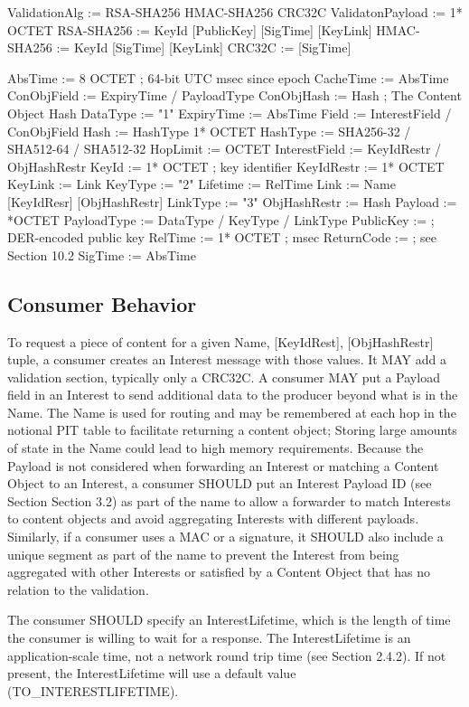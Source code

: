 \documentclass[12pt]{report}
\begin{document}
ValidationAlg := RSA-SHA256 HMAC-SHA256 CRC32C
ValidatonPayload := 1* OCTET
RSA-SHA256    := KeyId [PublicKey] [SigTime] [KeyLink]
HMAC-SHA256   := KeyId [SigTime] [KeyLink]
CRC32C        := [SigTime]

AbsTime       := 8 OCTET ; 64-bit UTC msec since epoch
CacheTime     := AbsTime
ConObjField   := ExpiryTime / PayloadType
ConObjHash    := Hash ; The Content Object Hash
DataType      := "1"
ExpiryTime    := AbsTime
Field         := InterestField / ConObjField
Hash          := HashType 1* OCTET
HashType      := SHA256-32 / SHA512-64 / SHA512-32
HopLimit      := OCTET
InterestField := KeyIdRestr / ObjHashRestr
KeyId         := 1* OCTET ; key identifier
KeyIdRestr    := 1* OCTET
KeyLink       := Link
KeyType       := "2"
Lifetime      := RelTime
Link          := Name [KeyIdResr] [ObjHashRestr]
LinkType      := "3"
ObjHashRestr  := Hash
Payload       := *OCTET
PayloadType   := DataType / KeyType / LinkType
PublicKey     := ; DER-encoded public key
RelTime       := 1* OCTET ; msec
ReturnCode    := ; see Section 10.2
SigTime       := AbsTime

\subsection{Consumer Behavior}
To request a piece of content for a given {Name, [KeyIdRest],
[ObjHashRestr]} tuple, a consumer creates an Interest message with
those values.  It MAY add a validation section, typically only a
CRC32C.  A consumer MAY put a Payload field in an Interest to send
additional data to the producer beyond what is in the Name.  The Name
is used for routing and may be remembered at each hop in the notional
PIT table to facilitate returning a content object; Storing large
amounts of state in the Name could lead to high memory requirements.
Because the Payload is not considered when forwarding an Interest or
matching a Content Object to an Interest, a consumer SHOULD put an
Interest Payload ID (see Section Section 3.2) as part of the name to
allow a forwarder to match Interests to content objects and avoid
aggregating Interests with different payloads.  Similarly, if a
consumer uses a MAC or a signature, it SHOULD also include a unique
segment as part of the name to prevent the Interest from being
aggregated with other Interests or satisfied by a Content Object that
has no relation to the validation.

The consumer SHOULD specify an InterestLifetime, which is the length
of time the consumer is willing to wait for a response.  The
InterestLifetime is an application-scale time, not a network round
trip time (see Section 2.4.2).  If not present, the InterestLifetime
will use a default value (TO\_INTERESTLIFETIME).
\end{document}
